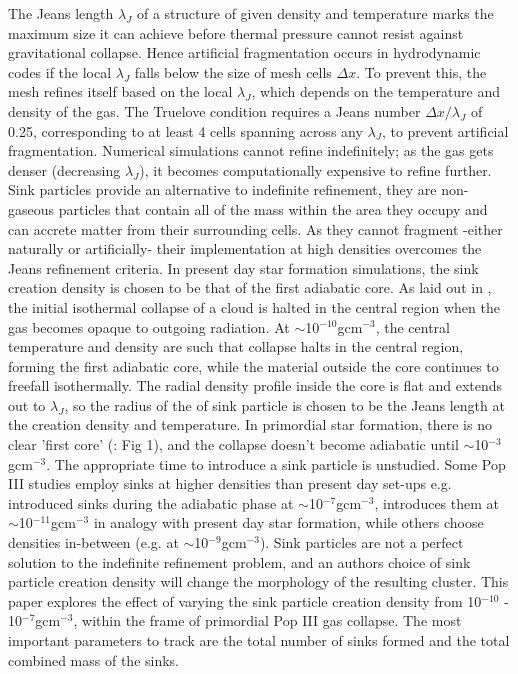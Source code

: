 \documentclass[fleqn,usenatbib]{mnras}
\begin{document}
The Jeans length $\lambda_J$ of a structure of given density and temperature marks the maximum size it can achieve before thermal pressure cannot resist against gravitational collapse. Hence artificial fragmentation occurs in hydrodynamic codes if the local $\lambda_J$ falls below the size of mesh cells $\Delta x$. To prevent this, the mesh refines itself based on the local $\lambda_J$, which depends on the temperature and density of the gas. The Truelove condition \citep{Truelove1997} requires a Jeans number $\Delta x/\lambda_J$ of 0.25, corresponding to at least 4 cells spanning across any $\lambda_J$, to prevent artificial fragmentation. Numerical simulations cannot refine indefinitely; as the gas gets denser (decreasing $\lambda_J$), it becomes computationally expensive to refine further. Sink particles \citep{Bate1995} provide an alternative to indefinite refinement, they are non-gaseous particles that contain all of the mass within the area they occupy and can accrete matter from their surrounding cells. As they cannot fragment -either naturally or artificially- their implementation at high densities overcomes the Jeans refinement criteria. In present day star formation simulations, the sink creation density is chosen to be that of the first adiabatic core. As laid out in \citep{Larson1969}, the initial isothermal collapse of a cloud is halted in the central region when the gas becomes opaque to outgoing radiation. At $\sim$10$^{-10}$gcm$^{-3}$, the central temperature and density are such that collapse halts in the central region, forming the first adiabatic core, while the material outside the core continues to freefall isothermally. The radial density profile inside the core is flat and extends out to $\lambda_J$, so the radius of the of sink particle is chosen to be the Jeans length at the creation density and temperature. In primordial star formation, there is no clear 'first core' (\citealt{Omukai2005}: Fig 1), and the collapse doesn't become adiabatic until $\sim$10$^{-3}$gcm$^{-3}$. The appropriate time to introduce a sink particle is unstudied. Some Pop III studies employ sinks at higher densities than present day set-ups e.g. \cite{Clark2011} introduced sinks during the adiabatic phase at $\sim$10$^{-7}$gcm$^{-3}$, \cite{Sharda2020} introduces them at $\sim$10$^{-11}$gcm$^{-3}$ in analogy with present day star formation, while others choose densities in-between (e.g. \citealt{Wollenberg2019} at $\sim$10$^{-9}$gcm$^{-3}$). Sink particles are not a perfect solution to the indefinite refinement problem, and an authors choice of sink particle creation density will change the morphology of the resulting cluster. This paper explores the effect of varying the sink particle creation density from 10$^{-10}$ - 10$^{-7}$gcm$^{-3}$, within the frame of primordial Pop III gas collapse. The most important parameters to track are the total number of sinks formed and the total combined mass of the sinks.
\end{document}
